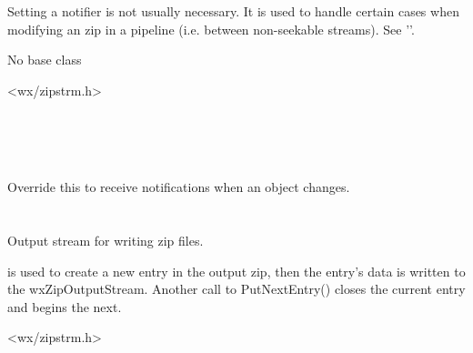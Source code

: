 Setting a notifier is not usually necessary. It is used to handle
certain cases when modifying an zip in a pipeline (i.e. between
non-seekable streams).
See ''.


No base class


<wx/zipstrm.h>


\\
\\
\\



\label{wxzipnotifieronentryupdated}


Override this to receive notifications when
an  object changes.


%
%

\section{}\label{wxzipoutputstream}

Output stream for writing zip files.

 is used to create
a new entry in the output zip, then the entry's data is written to the
wxZipOutputStream.  Another call to PutNextEntry() closes the current
entry and begins the next.




<wx/zipstrm.h>


\\
\\

